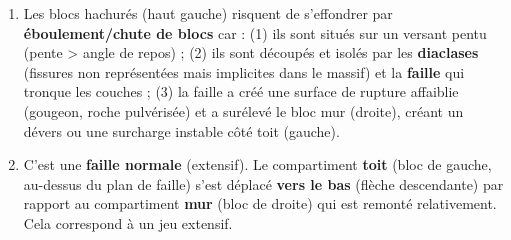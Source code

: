 \documentclass[11pt]{article}
\begin{document}
\begin{exercice}
\begin{enumerate}
\item Les blocs hachurés (haut gauche) risquent de s'effondrer par \textbf{éboulement/chute de blocs} car : (1) ils sont situés sur un versant pentu (pente > angle de repos) ; (2) ils sont découpés et isolés par les \textbf{diaclases} (fissures non représentées mais implicites dans le massif) et la \textbf{faille} qui tronque les couches ; (3) la faille a créé une surface de rupture affaiblie (gougeon, roche pulvérisée) et a surélevé le bloc mur (droite), créant un dévers ou une surcharge instable côté toit (gauche).
\item C'est une \textbf{faille normale} (extensif). Le compartiment \textbf{toit} (bloc de gauche, au-dessus du plan de faille) s'est déplacé \textbf{vers le bas} (flèche descendante) par rapport au compartiment \textbf{mur} (bloc de droite) qui est remonté relativement. Cela correspond à un jeu extensif.
\end{enumerate}
\end{exercice}
\end{document}
